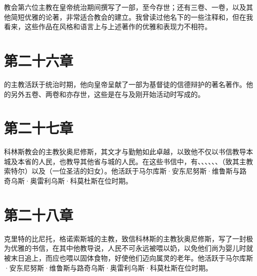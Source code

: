 教会第六位主教在皇帝统治期间撰写了一部，至今存世；还有三卷、一卷，以及其他简短优雅的论著，非常适合教会的建立。我曾读过他名下的一些注释和，但在我看来，这些作品在风格和语言上与上述著作的优雅和表现力不相符。\par


\section{第二十六章}

的主教活跃于统治时期，他向皇帝呈献了一部为基督徒的信德辩护的著名著作。他的另外五卷、两卷和亦存世，这些是在与及刚开始活动时写成的。\par


\section{第二十七章}

科林斯教会的主教狄奥尼修斯，其文才与勤勉如此卓越，以致他不仅以书信教导本城及本省的人民，也教导其他省与城的人民。在这些书信中，有、、、、、、（致其主教索特尔）以及（一位圣洁的妇女）。他活跃于马尔库斯·安东尼努斯·维鲁斯与路奇乌斯·奥雷利乌斯·科莫杜斯在位时期。\newline{}\par


\section{第二十八章}

克里特的比尼托，格诺索斯城的主教，致信科林斯的主教狄奥尼修斯，写了一封极为优雅的书信，在其中他教导说，人民不可永远被喂以奶，以免他们尚为婴儿时就被末日追上，而应也喂以固体食物，好使他们迈向属灵的老年。他活跃于马尔库斯·安东尼努斯·维鲁斯与路奇乌斯·奥雷利乌斯·科莫杜斯在位时期。\newline{}\par


